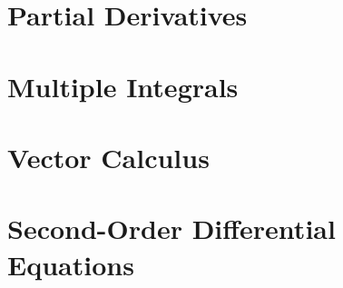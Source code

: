 \chapter{Partial Derivatives}
  
  
  
  
  
  
  
  

\chapter{Multiple Integrals}
  
  
  
  
  
  
  
  
  

\chapter{Vector Calculus}
  
  
  
  
  
  
  
  
  
  

\chapter{Second-Order Differential Equations}
  
  
  
  


